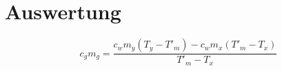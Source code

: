 \section{Auswertung}
\label{sec:Auswertung}

\begin{equation}
    c_gm_g = \frac{c_wm_y(T_y-T'_m)-c_wm_x(T'_m-T_x)}{T'_m-T_x}
\end{equation}